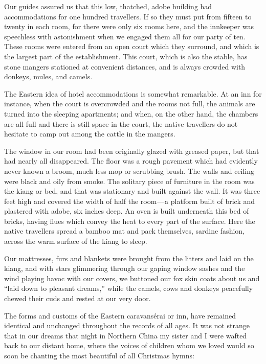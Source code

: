 \documentclass[12pt]{book}
\begin{document}
Our guides assured us that this low, thatched, adobe building had accommodations for one hundred travellers. If so they must put from fifteen to twenty in
each room, for there were only six rooms here, and the innkeeper was speechless
with astonishment when we engaged them all for our party of ten. These rooms
were entered from an open court which they surround, and which is the largest
part of the establishment. This court, which is also the stable, has stone mangers
stationed at convenient distances, and is always crowded with donkeys, mules,
and camels.

The Eastern idea of hotel accommodations is somewhat remarkable. At an
inn for instance, when the court is overcrowded and the rooms not full, the
animals are turned into the sleeping apartments; and when, on the other hand,
the chambers are all full and there is still space in the court, the native travellers
do not hesitate to camp out among the cattle in the mangers.

The window in our room had been originally glazed with greased paper, but
that had nearly all disappeared. The floor was a rough pavement which had
evidently never known a broom, much less mop or scrubbing brush. The walls
and ceiling were black and oily from smoke. The solitary piece of furniture in the
room was the kiang or bed, and that was stationary and built against the wall.
It was three feet high and covered the width of half the room — a platform built
of brick and plastered with adobe, six inches deep. An oven is built underneath
this bed of bricks, having flues which convey the heat to every part of the surface.
Here the native travellers spread a bamboo mat and pack themselves, sardine
fashion, across the warm surface of the kiang to sleep.

Our mattresses, furs and blankets were brought from the litters and laid on
the kiang, and with stars glimmering through our gaping window sashes and the
wind playing havoc with our covers, we buttoned our fox skin coats about us and
“laid down to pleasant dreams,” while the camels, cows and donkeys peacefully
chewed their cuds and rested at our very door.

The forms and customs of the Eastern caravansérai or inn, have remained
identical and unchanged throughout the records of all ages. It was not strange
that in our dreams that night in Northern China my sister and I were wafted back
to our distant home, where the voices of children whom we loved would so soon
be chanting the most beautiful of all Christmas hymns:
\end{document}
